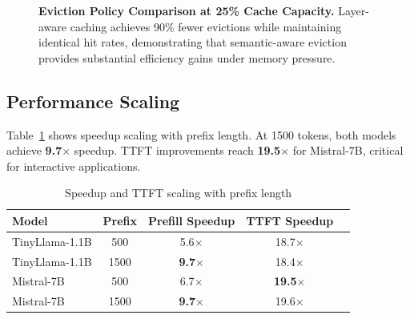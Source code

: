 \documentclass{article}
\begin{document}
\begin{figure}[t]
\caption{\textbf{Eviction Policy Comparison at 25\% Cache Capacity.} Layer-aware caching achieves 90\% fewer evictions while maintaining identical hit rates, demonstrating that semantic-aware eviction provides substantial efficiency gains under memory pressure.}
\label{fig:eviction}
\end{figure}

\subsection{Performance Scaling}

Table~\ref{tab:scaling} shows speedup scaling with prefix length.
At 1500 tokens, both models achieve \textbf{9.7$\times$} speedup.
TTFT improvements reach \textbf{19.5$\times$} for Mistral-7B, critical for interactive applications.

\begin{table}[h]
\centering
\caption{Speedup and TTFT scaling with prefix length}
\label{tab:scaling}
\begin{tabular}{lcccc}
\toprule
Model & Prefix & Prefill Speedup & TTFT Speedup \\
\midrule
TinyLlama-1.1B & 500 & 5.6$\times$ & 18.7$\times$ \\
TinyLlama-1.1B & 1500 & \textbf{9.7$\times$} & 18.4$\times$ \\
Mistral-7B & 500 & 6.7$\times$ & \textbf{19.5$\times$} \\
Mistral-7B & 1500 & \textbf{9.7$\times$} & 19.6$\times$ \\
\bottomrule
\end{tabular}
\end{table}
\end{document}
